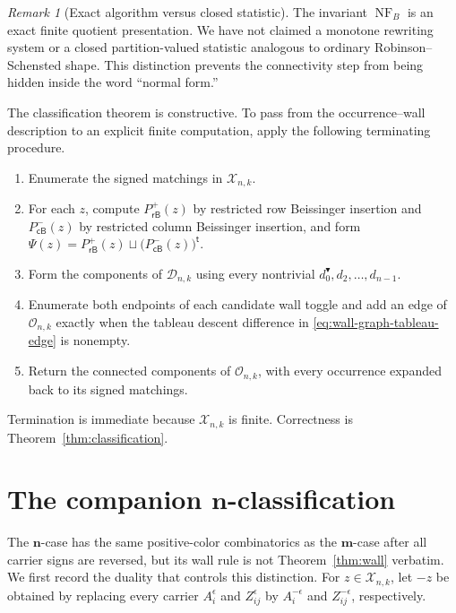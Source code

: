 \documentclass[11pt]{article}
\theoremstyle{definition}
\theoremstyle{remark}
\newtheorem{remark}[theorem]{Remark}
\newcommand{\NF}{\operatorname{NF}}
\newcommand{\cD}{\mathcal D}
\newcommand{\cO}{\mathcal O}
\newcommand{\cX}{\mathcal X}
\newcommand{\mgraph}{\mathbf m}
\newcommand{\ngraph}{\mathbf n}
\newcommand{\PRBSp}{P_{\mathsf{rB}}^{+}}
\newcommand{\PCBSm}{P_{\mathsf{cB}}^{-}}
\begin{document}
\begin{remark}[Exact algorithm versus closed statistic]
The invariant $\NF_B$ is an exact finite quotient presentation.  We have
not claimed a monotone rewriting system or a closed partition-valued
statistic analogous to ordinary Robinson--Schensted shape.  This
distinction prevents the connectivity step from being hidden inside the
word ``normal form.''
\end{remark}

The classification theorem is constructive.  To pass from the
occurrence--wall description to an explicit finite computation, apply the
following terminating procedure.

\begin{enumerate}[label=\textbf{Step \arabic*.},leftmargin=5.2em]
\item Enumerate the signed matchings in $\cX_{n,k}$.
\item For each $z$, compute $\PRBSp(z)$ by restricted row Beissinger
insertion and $\PCBSm(z)$ by restricted column Beissinger insertion, and
form
$\Psi(z)=\PRBSp(z)\sqcup\bigl(\PCBSm(z)\bigr)^{\mathsf t}$.
\item Form the components of $\cD_{n,k}$ using every nontrivial
$d_0^{\blacktriangledown},d_2,\ldots,d_{n-1}$.
\item Enumerate both endpoints of each candidate wall toggle and add an
edge of $\cO_{n,k}$ exactly when the tableau descent difference in
\eqref{eq:wall-graph-tableau-edge} is nonempty.
\item Return the connected components of $\cO_{n,k}$, with every
occurrence expanded back to its signed matchings.
\end{enumerate}

Termination is immediate because $\cX_{n,k}$ is finite.  Correctness is
Theorem~\ref{thm:classification}.

\section{The companion \texorpdfstring{$\ngraph$}{n}-classification}
\label{sec:n-case}

The $\ngraph$-case has the same positive-color combinatorics as the
$\mgraph$-case after all carrier signs are reversed, but its wall rule is
not Theorem~\ref{thm:wall} verbatim.  We first record the duality that
controls this distinction.  For $z\in\cX_{n,k}$, let $-z$ be obtained by
replacing every carrier $A_i^\epsilon$ and $Z_{ij}^\epsilon$ by
$A_i^{-\epsilon}$ and $Z_{ij}^{-\epsilon}$, respectively.
\end{document}
